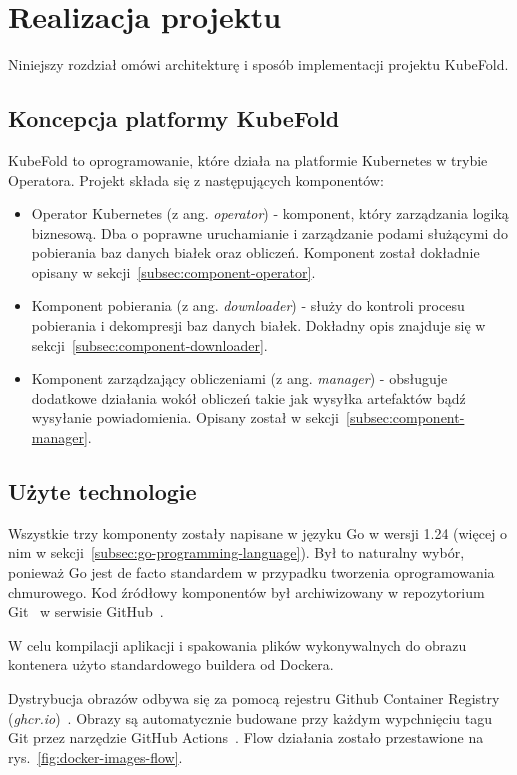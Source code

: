 \chapter{Realizacja projektu}
Niniejszy rozdział omówi architekturę i sposób implementacji projektu KubeFold.


\section{Koncepcja platformy KubeFold}
KubeFold to oprogramowanie, które działa na platformie Kubernetes w trybie Operatora.
Projekt składa się z następujących komponentów:
\begin{itemize}
    \item Operator Kubernetes (z ang. \textit{operator}) - komponent, który zarządzania logiką biznesową.
    Dba o poprawne uruchamianie i zarządzanie podami służącymi do pobierania baz danych białek oraz obliczeń.
    Komponent został dokładnie opisany w sekcji~\ref{subsec:component-operator}.
    \item Komponent pobierania (z ang. \textit{downloader}) - służy do kontroli procesu pobierania i dekompresji baz danych białek.
    Dokładny opis znajduje się w sekcji~\ref{subsec:component-downloader}.
    \item Komponent zarządzający obliczeniami (z ang. \textit{manager}) - obsługuje dodatkowe działania wokół obliczeń takie jak wysyłka artefaktów bądź wysyłanie powiadomienia.
    Opisany został w sekcji~\ref{subsec:component-manager}.
\end{itemize}


\section{Użyte technologie}
Wszystkie trzy komponenty zostały napisane w języku Go w wersji 1.24 (więcej o nim w sekcji~\ref{subsec:go-programming-language}).
Był to naturalny wybór, ponieważ Go jest de facto standardem w przypadku tworzenia oprogramowania chmurowego.
Kod źródłowy komponentów był archiwizowany w repozytorium Git~\cite{git} w serwisie GitHub~\cite{github}.

W celu kompilacji aplikacji i spakowania plików wykonywalnych do obrazu kontenera użyto standardowego buildera od Dockera.

Dystrybucja obrazów odbywa się za pomocą rejestru Github Container Registry (\textit{ghcr.io})~\cite{ghcr}.
Obrazy są automatycznie budowane przy każdym wypchnięciu tagu Git przez narzędzie GitHub Actions~\cite{github_actions}.
Flow działania zostało przestawione na rys.~\ref{fig:docker-images-flow}.

